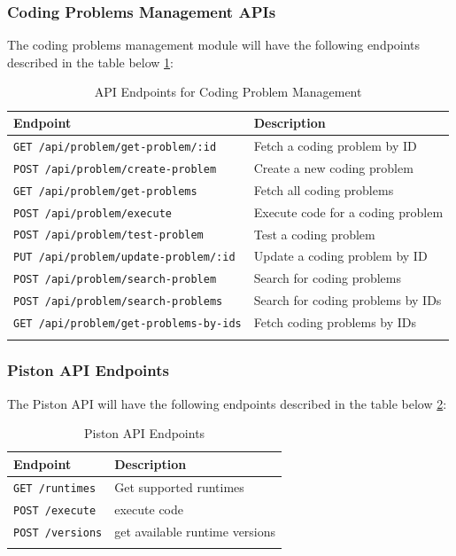 \subsubsection{Coding Problems Management APIs}
The coding problems management module will have the following endpoints described in the table below \ref{table:problemEndpoints}:

\begin{longtable}{|>{\centering\arraybackslash}p{6cm}|>{\centering\arraybackslash}p{8cm}|}
  \hline
  \rowcolor{blue!20} \textbf{Endpoint}          & \textbf{Description}              \\ \hline
  \texttt{GET /api/problem/get-problem/:id}     & Fetch a coding problem by ID      \\ \hline
  \texttt{POST /api/problem/create-problem}     & Create a new coding problem       \\ \hline
  \texttt{GET /api/problem/get-problems}        & Fetch all coding problems         \\ \hline
  \texttt{POST /api/problem/execute}            & Execute code for a coding problem \\ \hline
  \texttt{POST /api/problem/test-problem}       & Test a coding problem             \\ \hline
  \texttt{PUT /api/problem/update-problem/:id}  & Update a coding problem by ID     \\ \hline
  \texttt{POST /api/problem/search-problem}     & Search for coding problems        \\ \hline
  \texttt{POST /api/problem/search-problems}    & Search for coding problems by IDs \\ \hline
  \texttt{GET /api/problem/get-problems-by-ids} & Fetch coding problems by IDs      \\ \hline
  \caption{API Endpoints for Coding Problem Management} \label{table:problemEndpoints}
\end{longtable}

\subsubsection{Piston API Endpoints}
The Piston API will have the following endpoints described in the table below \ref{table:pistonEndpoints}:

\begin{longtable}{|>{\centering\arraybackslash}p{6cm}|>{\centering\arraybackslash}p{8cm}|}
  \hline
  \rowcolor{blue!20} \textbf{Endpoint} & \textbf{Description}           \\ \hline
  \texttt{GET /runtimes}               & Get supported runtimes         \\ \hline
  \texttt{POST /execute}               & execute code                   \\ \hline
  \texttt{POST /versions}              & get available runtime versions \\ \hline
  \caption{Piston API Endpoints} \label{table:pistonEndpoints}
\end{longtable}

